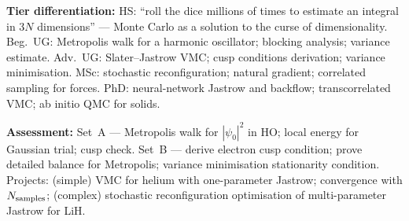 \documentclass[11pt,a4paper]{article}
\begin{document}
\begin{tcolorbox}[modulebox, title={Module~II.1 / L05: Quantum Monte Carlo I --- Variational QMC}]
\medskip\textbf{Tier differentiation:}
HS: ``roll the dice millions of times to estimate an integral in 3$N$ dimensions'' ---
Monte Carlo as a solution to the curse of dimensionality.
Beg.\ UG: Metropolis walk for a harmonic oscillator; blocking analysis; variance estimate.
Adv.\ UG: Slater--Jastrow VMC; cusp conditions derivation; variance minimisation.
MSc: stochastic reconfiguration; natural gradient; correlated sampling for forces.
PhD: neural-network Jastrow and backflow; transcorrelated VMC; ab initio QMC for solids.

\medskip\textbf{Assessment:}
Set~A --- Metropolis walk for $|\psi_0|^2$ in HO; local energy for Gaussian trial; cusp check.
Set~B --- derive electron cusp condition; prove detailed balance for Metropolis; variance minimisation
stationarity condition.
Projects: (simple) VMC for helium with one-parameter Jastrow; convergence with $N_{\rm samples}$;
(complex) stochastic reconfiguration optimisation of multi-parameter Jastrow for LiH.
\end{tcolorbox}

\medskip
\end{document}
